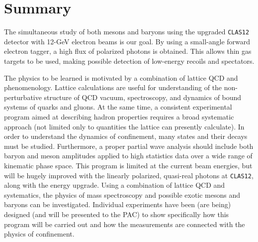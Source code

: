 \section{Summary}

The simultaneous study of both mesons and baryons using the upgraded 
{\tt CLAS12} detector with 12-GeV electron beams is our goal.  By using a 
small-angle forward electron tagger, a high flux of polarized photons 
is obtained. This allows thin gas targets to be used, making possible
detection of low-energy recoils and spectators.

The physics to be learned is motivated by a combination of lattice QCD 
and phenomenology.  Lattice calculations are useful for understanding of 
the non-perturbative structure of QCD vacuum, spectroscopy, and dynamics 
of bound systems of quarks and gluons.  At the same time, a consistent 
experimental program aimed at describing hadron properties requires a 
broad systematic approach (not limited only to quantities the lattice can
presently calculate). In order to understand the dynamics of confinement, 
many states and their decays must be studied.  Furthermore, a proper 
partial wave analysis should include both baryon and meson amplitudes 
applied to high statistics data over a wide range of kinematic phase space.  
This program is limited at the current beam energies, but will be hugely 
improved with the linearly polarized, quasi-real photons at {\tt CLAS12}, 
along with the energy upgrade.  Using a combination of lattice QCD and 
systematics, the physics of mass spectroscopy and possible exotic mesons 
and baryons can be investigated.  Individual experiments have been (are 
being) designed (and will be presented to the PAC) to show specifically 
how this program will be carried out and how the measurements are connected 
with the physics of confinement.
